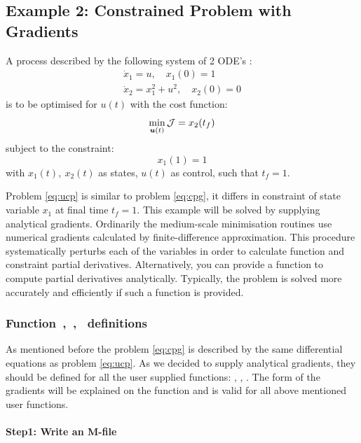 \subsection{Example 2: Constrained Problem with Gradients}
\label{sec:conprobgrad}

A process described by the following system of 2
ODE's \citep{raj01,luu91}:   
\begin{gather}
\dot{x}_1 = u, \quad x_{1}(0) = 1\\
\dot{x}_2 = x^{2}_{1} + u^{2}, \quad x_{2}(0) = 0
\end{gather} is to be optimised for $u(t)$ with the cost function:
\begin{equation}
\min_{\ve{u}(t)} \mf{J} = x_{2}(t_{f}) \label{eq:cpg} 
\end{equation} subject to the constraint:
\begin{equation}
x_{1}(1) = 1
\end{equation} with $x_{1}(t),~x_{2}(t)$ as states, $u(t)$ as control,
such that $t_{f} = 1$. 

Problem \eqref{eq:ucp} is similar to problem \eqref{eq:cpg}, it 
differs in constraint of state variable $x_{1}$ at final time
$t_{f}=1$. This example will be solved by supplying analytical
gradients. Ordinarily the medium-scale minimisation routines use
numerical gradients calculated by finite-difference
approximation. This procedure systematically perturbs each of the
variables in order to calculate function and constraint partial
derivatives. Alternatively, you can provide a function to compute 
partial derivatives analytically. Typically, the problem is solved
more accurately and efficiently if such a function is provided. 

\subsubsection{Function~,~,~  definitions}
\label{sec:conprobgrad-fundef}

As mentioned before the problem \eqref{eq:cpg} is described by the
same differential equations as problem \eqref{eq:ucp}. As we decided
to supply analytical gradients, they should be defined for all the
user supplied functions: , ,
. The form of the gradients will be explained on the
function  and is valid for all above mentioned user
functions.  

\paragraph{Step1: Write an M-file~}

